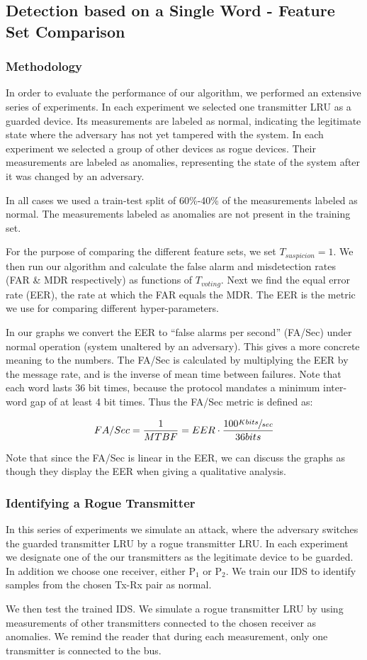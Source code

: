 \documentclass[compsoc,conference,a4paper]{IEEEtran}
\newcommand{\sublevel}[1]{\subsection{#1}}
\newcommand{\subsublevel}[1]{\subsubsection{#1}}
\newcommand{\sublevel}[1]{\section{#1}}
\newcommand{\subsublevel}[1]{\subsection{#1}}
\begin{document}
\sublevel{Detection based on a Single Word - Feature Set Comparison} \label{FeatureSetComparison}
\subsublevel{Methodology}
  In order to evaluate the performance of our algorithm, we performed an extensive series of experiments. In each experiment we selected one transmitter LRU as a guarded device. Its measurements are labeled as normal, indicating the legitimate state where the adversary has not yet tampered with the system. In each experiment we selected a group of other devices as rogue devices. Their measurements are labeled as anomalies, representing the state of the system after it was changed by an adversary.
  
  In all cases we used a train-test split of 60\%-40\% of the measurements labeled as normal. The measurements labeled as anomalies are not present in the training set.
  
  For the purpose of comparing the different feature sets, we set $T_{suspicion} = 1$. We then run our algorithm and calculate the false alarm and misdetection rates (FAR \& MDR respectively) as functions of $T_{voting}$. Next we find the equal error rate (EER), the rate at which the FAR equals the MDR. The EER is the metric we use for comparing different hyper-parameters.
  
  In our graphs we convert the EER to ``false alarms per second'' (FA/Sec) under normal operation (system unaltered by an adversary). This gives a more concrete meaning to the numbers. The FA/Sec is calculated by multiplying the EER by the message rate, and is the inverse of mean time between failures. Note that each word lasts 36 bit times, because the protocol mandates a minimum inter-word gap of at least 4 bit times. Thus the FA/Sec metric is defined as:
  
  \[FA/Sec = \frac{1}{MTBF} = EER \cdot \frac{100 \sfrac{Kbits}{sec}}{36bits}\]
  
  Note that since the FA/Sec is linear in the EER, we can discuss the graphs as though they display the EER when giving a qualitative analysis.
  
\subsublevel{Identifying a Rogue Transmitter}
  In this series of experiments we simulate an attack, where the adversary switches the guarded transmitter LRU by a rogue transmitter LRU. In each experiment we designate one of the our transmitters as the legitimate device to be guarded. In addition we choose one receiver, either \(\text{P}_1\) or \(\text{P}_2\).  We train our IDS to identify samples from the chosen Tx-Rx pair as normal.
  
  We then test the trained IDS. We simulate a rogue transmitter LRU by using measurements of other transmitters connected to the chosen receiver as anomalies. We remind the reader that during each measurement, only one transmitter is connected to the bus.
  
\end{document}
